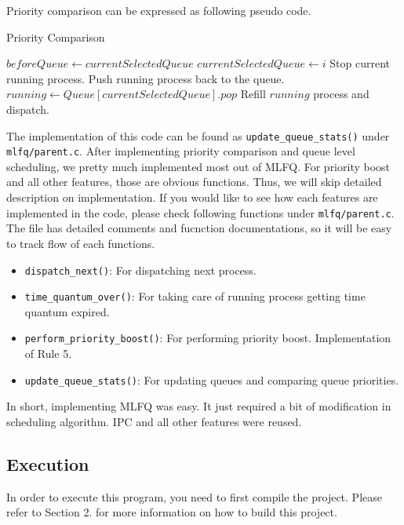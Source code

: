 \documentclass{homework}
\begin{document}
Priority comparison can be expressed as following pseudo code.
\begin{algorithm}
\caption{Priority Comparison}\label{alg:cap}
\begin{algorithmic}
\State $beforeQueue \gets currentSelectedQueue$
 
        \State $currentSelectedQueue \gets i$
    \EndIf
\EndFor
{}
    \State Stop current running process.
    \State Push running process back to the queue.
    \State $running \gets Queue[currentSelectedQueue].pop$
    \State Refill $running$ process and dispatch.
\EndIf
\end{algorithmic}
\end{algorithm}
The implementation of this code can be found as \texttt{update_queue_stats()} under \texttt{mlfq/parent.c}. After implementing priority comparison and queue level scheduling, we pretty much implemented most out of MLFQ. For priority boost and all other features, those are obvious functions. Thus, we will skip detailed description on implementation. If you would like to see how each features are implemented in the code, please check following functions under \texttt{mlfq/parent.c}. The file has detailed comments and fucnction documentations, so it will be easy to track flow of each functions.
\begin{itemize}
    \item \texttt{dispatch_next()}: For dispatching next process.
    \item \texttt{time_quantum_over()}: For taking care of running process getting time quantum expired.
    \item \texttt{perform_priority_boost()}: For performing priority boost. Implementation of Rule 5.
    \item \texttt{update_queue_stats()}: For updating queues and comparing queue priorities. 
\end{itemize}
In short, implementing MLFQ was easy. It just required a bit of modification in scheduling algorithm. IPC and all other features were reused.
\pagebreak
\subsection{Execution}
In order to execute this program, you need to first compile the project. Please refer to Section 2. for more information on how to build this project.
\end{document}
